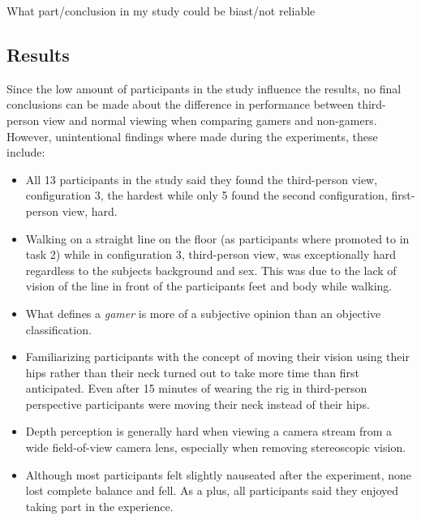 \documentclass[runningheads,a4paper,oribibl]{llncs}
\begin{document}
What part/conclusion in my study could be biast/not reliable




\subsection{Results}
Since the low amount of participants in the study influence the results, no final conclusions can be made about the difference in performance between third-person view and normal viewing when comparing gamers and non-gamers. However, unintentional findings where made during the experiments, these include:
\begin{itemize}
	\item All 13 participants in the study said they found the third-person view, configuration 3, the hardest while only 5 found the second configuration, first-person view, hard.

	\item Walking on a straight line on the floor (as participants where promoted to in task 2) while in configuration 3, third-person view, was exceptionally hard regardless to the subjects background and sex. This was due to the lack of vision of the line in front of the participants feet and body while walking. 

	\item What defines a \emph{gamer} is more of a subjective opinion than an objective classification.

	\item Familiarizing participants with the concept of moving their vision using their hips rather than their neck turned out to take more time than first anticipated. Even after 15 minutes of wearing the rig in third-person perspective participants were moving their neck instead of their hips.

	\item Depth perception is generally hard when viewing a camera stream from a wide field-of-view camera lens, especially when removing stereoscopic vision.

	\item Although most participants felt slightly nauseated after the experiment, none lost complete balance and fell. As a plus, all participants said they enjoyed taking part in the experience.
\end{itemize}
\end{document}
